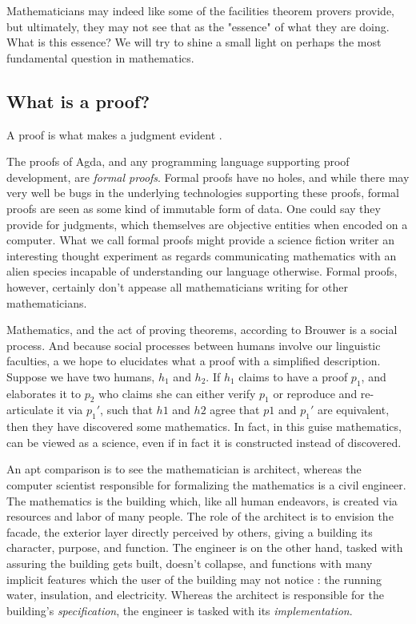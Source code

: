 Mathematicians may indeed like some of the facilities theorem provers provide,
but ultimately, they may not see that as the "essence" of what they are doing.
What is this essence? We will try to shine a small light on perhaps the most
fundamental question in mathematics.

\subsection{What is a proof?}

\begin{displayquote}

A proof is what makes a judgment evident \cite{mlMeanings}.

\end{displayquote}

The proofs of Agda, and any programming language supporting proof development,
are \emph{formal proofs}. Formal proofs have no holes, and while there may very
well be bugs in the underlying technologies supporting these proofs, formal
proofs are seen as some kind of immutable form of data. One could say they
provide \cite{objective evidence} for judgments, which themselves are objective
entities when encoded on a computer. What we call
formal proofs might provide a science fiction writer an interesting thought
experiment as regards communicating mathematics with an alien species incapable
of understanding our language otherwise. Formal proofs, however, certainly don't appease all
mathematicians writing for other mathematicians.

Mathematics, and the act of proving theorems, according to Brouwer is a social
process. And because social processes between humans involve our linguistic
faculties, a we hope to elucidates what a proof with a simplified description.
Suppose we have two humans, $h_1$ and $h_2$. If $h_1$ claims to have a proof
$p_1$, and elaborates it to $p_2$ who claims she can either verify $p_1$ or
reproduce and re-articulate it via $p_1'$, such that $h1$ and $h2$ agree that
$p1$ and $p_1'$ are equivalent, then they have discovered some mathematics. In
fact, in this guise mathematics, can be viewed as a science, even if in fact it
is constructed instead of discovered.

An apt comparison is to see the mathematician is architect, whereas the computer
scientist responsible for formalizing the mathematics is a civil engineer. The
mathematics is the building which, like all human endeavors, is created via
resources and labor of many people. The role of the architect is to envision the
facade, the exterior layer directly perceived by others, giving a building its
character, purpose, and function. The engineer is on the other hand, tasked with
assuring the building gets built, doesn't collapse, and functions with many
implicit features which the user of the building may not notice : the running
water, insulation, and electricity. Whereas the architect is responsible for the
building's \emph{specification}, the engineer is tasked with its
\emph{implementation}.

